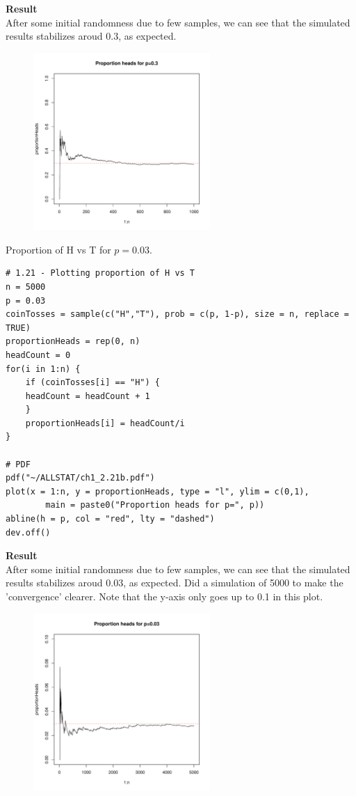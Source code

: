 \medskip\noindent
\textbf{Result}\\
After some initial randomness due to few samples, we can see that the simulated results stabilizes
aroud 0.3, as expected.
\begin{figure}[H]
    \includegraphics[width=0.6\textwidth]{ch1_2.21a.pdf}
\end{figure}


\newpage\noindent
Proportion of H vs T for $p=0.03$.
\begin{lstlisting}[style=RSyntax, title=R]
# 1.21 - Plotting proportion of H vs T
n = 5000
p = 0.03
coinTosses = sample(c("H","T"), prob = c(p, 1-p), size = n, replace = TRUE)
proportionHeads = rep(0, n)
headCount = 0
for(i in 1:n) {
    if (coinTosses[i] == "H") {
    headCount = headCount + 1
    } 
    proportionHeads[i] = headCount/i
} 

# PDF
pdf("~/ALLSTAT/ch1_2.21b.pdf")
plot(x = 1:n, y = proportionHeads, type = "l", ylim = c(0,1),
        main = paste0("Proportion heads for p=", p))
abline(h = p, col = "red", lty = "dashed")
dev.off()        
\end{lstlisting}

\medskip\noindent
\textbf{Result}\\
After some initial randomness due to few samples, we can see that the simulated results stabilizes
aroud 0.03, as expected. Did a simulation of 5000 to make the 'convergence' clearer. Note that the
y-axis only goes up to 0.1 in this plot.
\begin{figure}[H]
    \includegraphics[width=0.6\textwidth]{ch1_2.21b.pdf}
\end{figure}



